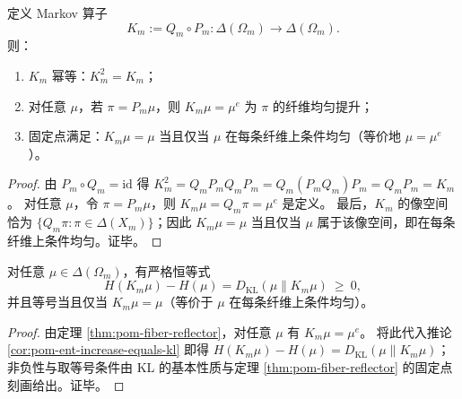 \begin{theorem}\label{thm:pom-fiber-reflector}
定义 Markov 算子
\[
K_m:=Q_m\circ P_m:\Delta(\Omega_m)\to\Delta(\Omega_m).
\]
则：
\begin{enumerate}
  \item $K_m$ 幂等：$K_m^2=K_m$；
  \item 对任意 $\mu$，若 $\pi=P_m\mu$，则 $K_m\mu=\mu^e$ 为 $\pi$ 的纤维均匀提升；
  \item 固定点满足：$K_m\mu=\mu$ 当且仅当 $\mu$ 在每条纤维上条件均匀（等价地 $\mu=\mu^e$）。
\end{enumerate}
\end{theorem}
\begin{proof}
由 $P_m\circ Q_m=\mathrm{id}$ 得
\(
K_m^2=Q_mP_mQ_mP_m=Q_m(P_mQ_m)P_m=Q_mP_m=K_m
\)。
对任意 $\mu$，令 $\pi=P_m\mu$，则 $K_m\mu=Q_m\pi=\mu^e$ 是定义。
最后，$K_m$ 的像空间恰为 $\{Q_m\pi:\pi\in\Delta(X_m)\}$；因此 $K_m\mu=\mu$ 当且仅当 $\mu$ 属于该像空间，即在每条纤维上条件均匀。证毕。
\end{proof}

\begin{corollary}\label{cor:pom-second-law-Km}
对任意 $\mu\in\Delta(\Omega_m)$，有严格恒等式
\[
\boxed{\;
H(K_m\mu)-H(\mu)=D_{\mathrm{KL}}(\mu\|K_m\mu)\ \ge\ 0,
\;}
\]
并且等号当且仅当 $K_m\mu=\mu$（等价于 $\mu$ 在每条纤维上条件均匀）。
\end{corollary}
\begin{proof}
由定理 \ref{thm:pom-fiber-reflector}，对任意 $\mu$ 有 $K_m\mu=\mu^e$。
将此代入推论 \ref{cor:pom-ent-increase-equals-kl} 即得
\(
H(K_m\mu)-H(\mu)=D_{\mathrm{KL}}(\mu\|K_m\mu)
\)；
非负性与取等号条件由 KL 的基本性质与定理 \ref{thm:pom-fiber-reflector} 的固定点刻画给出。证毕。
\end{proof}

